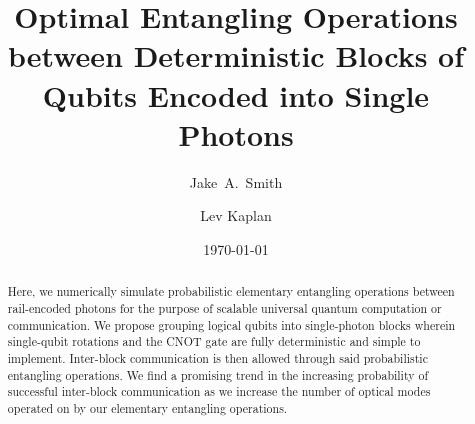 \documentclass[aps,pra,twocolumn,showpacs,superscriptaddress,floatfix,10pt]{revtex4}
\begin{document}
\newcommand{\beq}{\begin{equation}}
\newcommand{\eeq}{\end{equation}}
\newcommand{\ben}{\begin{eqnarray}}
\newcommand{\een}{\end{eqnarray}}
\newcommand{\bea}{\begin{array}}
\newcommand{\eea}{\end{array}}
\newcommand{\om}{(\omega )}
\newcommand{\bef}{\begin{figure}}
\newcommand{\eef}{\end{figure}}
\newcommand{\leg}[1]{\caption{\protect\rm{\protect\footnotesize{#1}}}}
\newcommand{\ew}[1]{\langle{#1}\rangle}
\newcommand{\be}[1]{\mid\!{#1}\!\mid}
\newcommand{\no}{\nonumber}
\newcommand{\etal}{{\em et~al }}
\newcommand{\geff}{g_{\mbox{\it{\scriptsize{eff}}}}}
\newcommand{\da}[1]{{#1}^\dagger}
\newcommand{\cf}{{\it cf.\/}\ }
\newcommand{\ie}{{\it i.e.\/}\ }   

\newcommand{\spazio}{\vspace{0.3cm}}%
\newcommand{\de}[1]{\frac{\partial}{\partial{#1}}}
\newcommand{\U}{\tilde{U}}
\newcommand{\V}{\tilde{V}}


\title{Optimal Entangling Operations between Deterministic Blocks of Qubits Encoded into Single Photons}

\author{Jake~A.~Smith}

\author{Lev Kaplan}

 \begin{abstract}
Here, we numerically simulate probabilistic elementary entangling operations between rail-encoded photons for the purpose of scalable universal quantum computation or communication. We propose grouping logical qubits into single-photon blocks wherein single-qubit rotations and the CNOT gate are fully deterministic and simple to implement. Inter-block communication is then allowed through said probabilistic entangling operations. We find a promising trend in the increasing probability of successful inter-block communication as we increase the number of optical modes operated on by our elementary entangling operations.
\end{abstract}                                                               
\date{\today}
\maketitle
\end{document}
